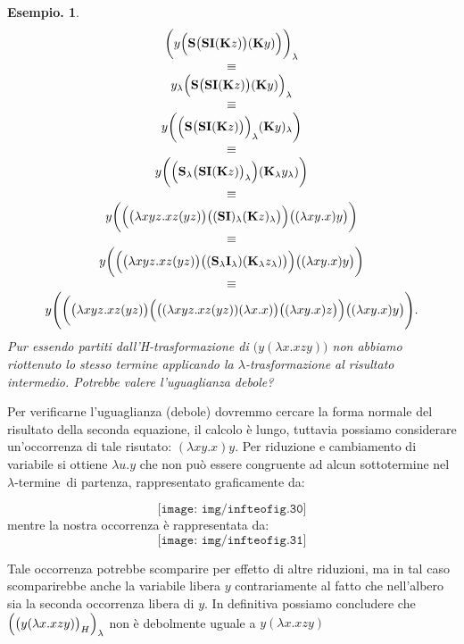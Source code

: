 \documentclass{book}
\newtheorem{esempio}{Esempio.}
\newcommand*{\ii}{\mathbf{I}}    %
\newcommand*{\kk}{\mathbf{K}}    %
\newcommand*{\sss}{\mathbf{S}}   %
\newcommand*{\lbt}{$\lambda$-ter\-mi\-ne}
\begin{document}
\begin{esempio}
\[
\begin{array}{c}
   \biggl(y\Bigl(\sss \bigl( \sss \ii (\kk z)\bigr) (\kk y) 
              \Bigr)\biggr)_\lambda  \\
    \equiv \\ y_\lambda
             \Bigl(\sss \bigl( \sss \ii (\kk z)\bigr) (\kk y) \Bigr)_\lambda \\
    \equiv \\ y\biggl( \Bigl(\sss \bigl( \sss \ii (\kk z)\bigr) \Bigr)_\lambda
              (\kk y)_\lambda \biggr) \\
    \equiv \\ y\biggl(\Bigl( \sss_\lambda \bigl( \sss \ii (\kk z)\bigr)_\lambda
              \Bigr) (\kk_\lambda y_\lambda) \biggr) \\
    \equiv \\ y\biggl(\Bigl(\bigl(\lambda xyz.xz(yz)\bigr) 
              \bigl((\sss \ii)_\lambda (\kk z)_\lambda \bigr) \Bigr)
              \bigl((\lambda xy.x)y\bigr) \biggr) \\
    \equiv \\ y\biggl(\Bigl(\bigl(\lambda xyz.xz(yz)\bigr) 
              \bigl((\sss_\lambda \ii_\lambda) (\kk_\lambda z_\lambda)
              \bigr) \Bigr)\bigl((\lambda xy.x)y\bigr) \biggr) \\
    \equiv \\ y\Biggl(\biggl(\bigl(\lambda xyz.xz(yz)\bigr) 
              \Bigl(\bigl((\lambda xyz.xz(yz)) (\lambda x.x)\bigr) \bigl(
             (\lambda xy.x)z\bigr) \Bigr)\bigl((\lambda xy.x)y\bigr) \Biggr).\\
\end{array}
\]
Pur essendo partiti dall'H-trasformazione di $\bigl(y(\lambda x.xzy)\bigr)$
\emph{non} abbiamo riottenuto lo stesso termine applicando la 
$\lambda$-trasformazione al risultato intermedio. Potrebbe valere l'uguaglianza
debole?
\end{esempio}
Per verificarne l'uguaglianza (debole) dovremmo cercare la forma normale del
risultato della seconda equazione, il calcolo \`e lungo, tuttavia possiamo
considerare un'occorrenza di tale risutato: $(\lambda xy.x)y$.
Per riduzione e cambiamento di variabile si ottiene $\lambda u.y$ che non pu\`o
essere congruente ad alcun sottotermine nel \lbt~di partenza, rappresentato 
graficamente da:


\[ \texttt{[image: img/infteofig.30]} \]
mentre la nostra occorrenza \`e rappresentata da: 
\[ \texttt{[image: img/infteofig.31]} \]

Tale occorrenza potrebbe scomparire per effetto di altre riduzioni, ma in tal
caso scomparirebbe anche la variabile libera $y$ contrariamente al fatto che 
nell'albero sia la seconda occorrenza libera di $y$.
In definitiva possiamo concludere che $\Bigl(\bigl(y(\lambda x.xzy)\bigr)_H 
\Bigr)_\lambda$ non \`e debolmente uguale a $y(\lambda x.xzy)$
\end{document}
